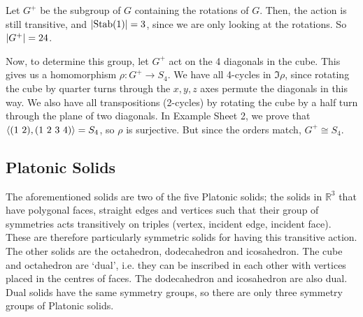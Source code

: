 \documentclass{article}
\begin{document}
Let $G^+$ be the subgroup of $G$ containing the rotations of $G$. Then, the action is still transitive, and $\abs{\operatorname{Stab}(1)} = 3$, since we are only looking at the rotations. So $\abs{G^+} = 24$.

Now, to determine this group, let $G^+$ act on the 4 diagonals in the cube. This gives us a homomorphism $\rho\colon G^+ \to S_4$. We have all 4-cycles in $\Im \rho$, since rotating the cube by quarter turns through the $x, y, z$ axes permute the diagonals in this way. We also have all transpositions (2-cycles) by rotating the cube by a half turn through the plane of two diagonals. In Example Sheet 2, we prove that $\langle (1\ 2), (1\ 2\ 3\ 4) \rangle = S_4$, so $\rho$ is surjective. But since the orders match, $G^+ \cong S_4$.

\subsection{Platonic Solids}
The aforementioned solids are two of the five Platonic solids; the solids in $\mathbb R^3$ that have polygonal faces, straight edges and vertices such that their group of symmetries acts transitively on triples (vertex, incident edge, incident face). These are therefore particularly symmetric solids for having this transitive action. The other solids are the octahedron, dodecahedron and icosahedron. The cube and octahedron are `dual', i.e. they can be inscribed in each other with vertices placed in the centres of faces. The dodecahedron and icosahedron are also dual. Dual solids have the same symmetry groups, so there are only three symmetry groups of Platonic solids.
\end{document}
